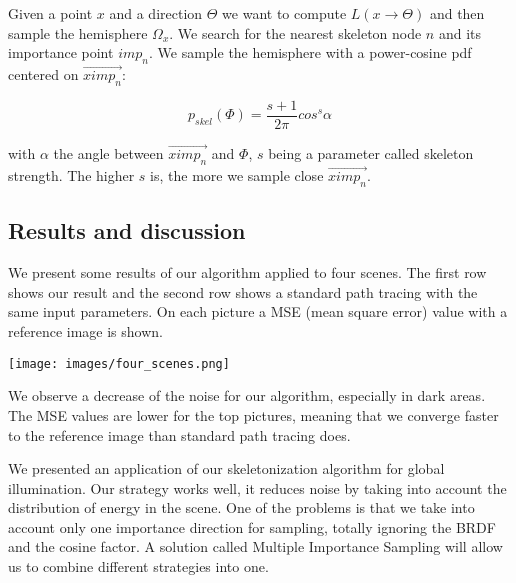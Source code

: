 Given a point $x$ and a direction $\Theta$ we want to compute $L(x \rightarrow \Theta)$ and then sample the hemisphere $\Omega_x$. We search for the nearest skeleton node $n$ and its importance point $imp_n$. We sample the hemisphere with a power-cosine pdf centered on $\overrightarrow{ximp_n}$:

\begin{equation*}
p_{skel}(\Phi) = \frac{s + 1}{2\pi} cos^s \alpha
\end{equation*}

with $\alpha$ the angle between $\overrightarrow{ximp_n}$ and $\Phi$, $s$ being a parameter called skeleton strength. The higher $s$ is, the more we sample close $\overrightarrow{ximp_n}$.

\subsection{Results and discussion}

We present some results of our algorithm applied to four scenes. The first row shows our result and the second row shows a standard path tracing with the same input parameters. On each picture a MSE (mean square error) value with a reference image is shown.

\begin{center}
\texttt{[image: images/four\_scenes.png]}
\end{center}

We observe a decrease of the noise for our algorithm, especially in dark areas. The MSE values are lower for the top pictures, meaning that we converge faster to the reference image than standard path tracing does.

We presented an application of our skeletonization algorithm for global illumination. Our strategy works well, it reduces noise by taking into account the distribution of energy in the scene. One of the problems is that we take into account only one importance direction for sampling, totally ignoring the BRDF and the cosine factor. A solution called Multiple Importance Sampling will allow us to combine different strategies into one.